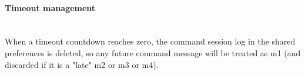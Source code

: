 \paragraph{Timeout management}\hspace{0pt}\\
When a timeout countdown reaches zero, the command session log in the shared preferences is deleted, so any future command message will be treated as m1 (and discarded if it is a "late" m2 or m3 or m4).